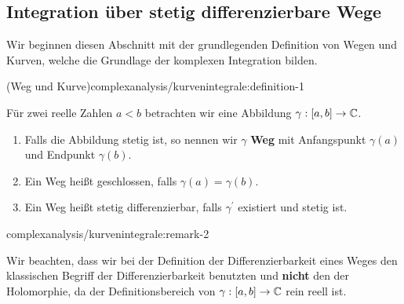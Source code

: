 \subsection{Integration über stetig differenzierbare Wege}
\label{\detokenize{complexanalysis/kurvenintegrale:integration-uber-stetig-differenzierbare-wege}}
\par
Wir beginnen diesen Abschnitt mit der grundlegenden Definition von Wegen und Kurven, welche die Grundlage der komplexen Integration bilden.
\begin{definition}{(Weg und Kurve)}{complexanalysis/kurvenintegrale:definition-1}



\par
Für zwei reelle Zahlen \(a<b\) betrachten wir eine Abbildung \(\gamma:[a,b]\to\mathbb{C}\).
\begin{enumerate}

\item {} 
\par
Falls die Abbildung stetig ist, so nennen wir \(\gamma\) \textbf{Weg} mit Anfangspunkt \(\gamma(a)\) und Endpunkt \(\gamma(b)\).

\item {} 
\par
Ein Weg heißt geschlossen, falls \(\gamma(a)=\gamma(b)\).

\item {} 
\par
Ein Weg heißt stetig differenzierbar, falls \(\gamma^\prime\) existiert und stetig ist.

\end{enumerate}
\end{definition}
\begin{remark}{}{complexanalysis/kurvenintegrale:remark-2}



\par
Wir beachten, dass wir bei der Definition der Differenzierbarkeit eines Weges den klassischen Begriff der Differenzierbarkeit benutzten und \textbf{nicht} den der Holomorphie, da der Definitionsbereich von \(\gamma:[a,b]\to\mathbb{C}\) rein reell ist.
\end{remark}

